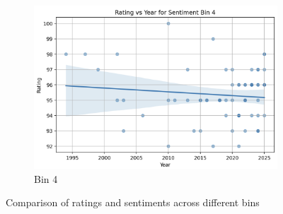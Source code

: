 \documentclass{article}
\begin{document}
\begin{figure}[!ht]
    \begin{subfigure}[b]{0.45\linewidth}
        \centering
        \includegraphics[width=\linewidth]{Bin4.png}
        \caption{Bin 4}
        \label{fig:bin4}
    \end{subfigure}

    \caption{Comparison of ratings and sentiments across different bins}
    \label{fig:bins_side_by_side}
\end{figure}
\end{document}

